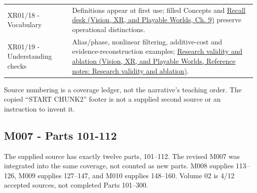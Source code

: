 {\begin{longtable}[]{@{}
  >{\raggedright\arraybackslash}p{}
  >{\raggedright\arraybackslash}p{}@{}}
XR01/18 - Vocabulary & Definitions appear at first use; filled Concepts and \href{../07-Vision-XR-and-Playable-Worlds/main.pdf\#nameddest=04-visual-computing-ii-ch042-teach-the-distinctions-from-a-blank-board}{Recall desk (Vision, XR, and Playable Worlds, Ch. 9)} preserve operational distinctions. \\
XR01/19 - Understanding checks & Alias/phase, nonlinear filtering, additive-cost and evidence-reconstruction examples; \href{../07-Vision-XR-and-Playable-Worlds/main.pdf\#nameddest=appendix-65788587ef78}{Research validity and ablation (Vision, XR, and Playable Worlds, Reference notes: Research validity and ablation)}. \\
\end{longtable}
}

Source numbering is a coverage ledger, not the narrative's teaching order. The copied ``START CHUNK2'' footer is not a supplied second source or an instruction to invent it.

\subsection{M007 - Parts 101-112}\label{appendix-fd090d982a15-m007---parts-101-112}

\hypertarget{appendix-fd090d982a15-m007---parts-101-112}{}

The supplied source has exactly twelve parts, 101--112. The revised M007 was integrated into the same coverage, not counted as new parts. M008 supplies 113--126, M009 supplies 127--147, and M010 supplies 148--160. Volume 02 is 4/12 accepted sources, not completed Parts 101--300.

